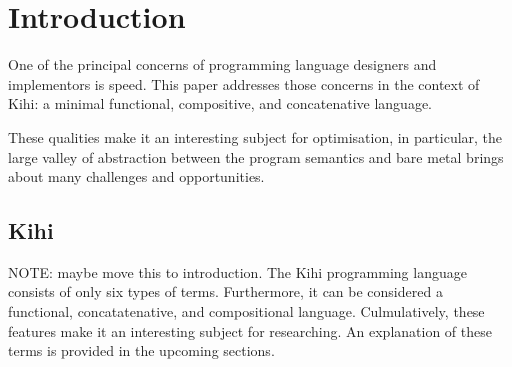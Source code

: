 \chapter{Introduction} \label{C:intro}
One of the principal concerns of programming language designers
and implementors is speed. This paper addresses those concerns
in the context of Kihi: a minimal functional, compositive,
and concatenative language. 

These qualities make it an 
interesting subject for optimisation, in particular, the large
valley of abstraction between the program semantics and bare
metal brings about many challenges and opportunities.




\section{Kihi}
NOTE: maybe move this to introduction.
The Kihi programming language consists of only six types of terms.
Furthermore, it can be considered a functional, concatatenative,
and compositional language. Culmulatively, these features make it
an interesting subject for researching. An explanation of these
terms is provided in the upcoming sections. 